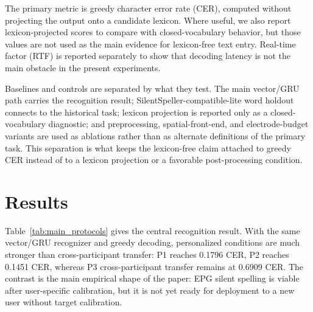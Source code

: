 
The primary metric is greedy character error rate (CER), computed without projecting the output onto a candidate lexicon. Where useful, we also report lexicon-projected scores to compare with closed-vocabulary behavior, but those values are not used as the main evidence for lexicon-free text entry. Real-time factor (RTF) is reported separately to show that decoding latency is not the main obstacle in the present experiments.


Baselines and controls are separated by what they test. The main vector/GRU path carries the recognition result; SilentSpeller-compatible-lite word holdout connects to the historical task; lexicon projection is reported only as a closed-vocabulary diagnostic; and preprocessing, spatial-front-end, and electrode-budget variants are used as ablations rather than as alternate definitions of the primary task. This separation is what keeps the lexicon-free claim attached to greedy CER instead of to a lexicon projection or a favorable post-processing condition.


\section{Results}
Table~\ref{tab:main_protocols} gives the central recognition result. With the same vector/GRU recognizer and greedy decoding, personalized conditions are much stronger than cross-participant transfer: P1 reaches 0.1796 CER, P2 reaches 0.1451 CER, whereas P3 cross-participant transfer remains at 0.6909 CER. The contrast is the main empirical shape of the paper: EPG silent spelling is viable after user-specific calibration, but it is not yet ready for deployment to a new user without target calibration.


